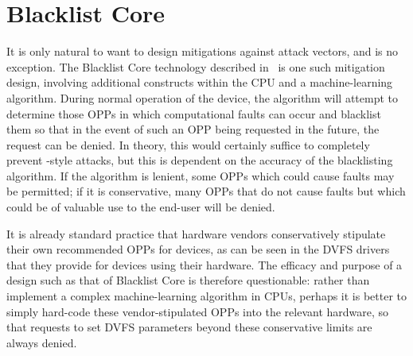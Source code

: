 \section{Blacklist Core}

It is only natural to want to design mitigations against attack vectors, and
\clkscrew{} is no exception. The Blacklist Core technology described
in~\cite{blacklistCore} is one such mitigation design, involving additional constructs
within the CPU and a machine-learning algorithm. During normal operation of the
device, the algorithm will attempt to determine those OPPs in which
computational faults can occur and blacklist them so that in the event of such
an OPP being requested in the future, the request can be denied. In theory, this
would certainly suffice to completely prevent \clkscrew{}-style attacks, but
this is dependent on the accuracy of the blacklisting algorithm. If the
algorithm is lenient, some OPPs which could cause faults may be permitted; if
it is conservative, many OPPs that do not cause faults but which could be of
valuable use to the end-user will be denied.

It is already standard practice that hardware vendors conservatively stipulate
their own recommended OPPs for devices, as can be seen in the DVFS drivers that
they provide for devices using their hardware. The efficacy and purpose of a
design such as that of Blacklist Core is therefore questionable: rather than
implement a complex machine-learning algorithm in CPUs, perhaps it is better to
simply hard-code these vendor-stipulated OPPs into the relevant hardware, so
that requests to set DVFS parameters beyond these conservative limits are always
denied.

